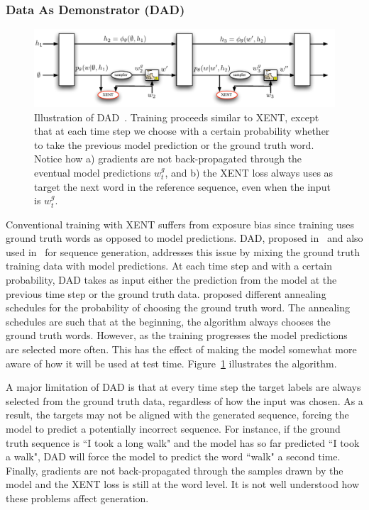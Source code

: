\subsubsection{Data As Demonstrator (DAD)} \label{model-dad}
\begin{figure}[!t]
\begin{center}
 \includegraphics[width=0.7\linewidth]{dad.pdf}
\end{center}
\caption{Illustration of DAD~\citep{sbengio-nips2015,
    dad}. Training
  proceeds similar to XENT, except that at each time step we choose with
  a certain probability whether to take the previous model prediction or
  the ground truth word. Notice how a) gradients are not
  back-propagated through the eventual model predictions $w^g_t$, and
  b) the XENT loss always uses as target the next word in the reference
  sequence, even when the input is $w^g_t$.}
\label{fig:dad}
\end{figure}
Conventional training with XENT suffers from exposure bias since  
training uses ground truth words as opposed to model predictions.
DAD, proposed in~\citep{dad} and also used in~\citep{sbengio-nips2015} for sequence generation, addresses this issue by mixing the ground truth training data with model predictions.
At each time step and with a certain probability, DAD takes as input either the prediction from the model at the previous time step or the ground truth data. \citet{sbengio-nips2015} proposed  different 
annealing schedules for the probability of choosing the ground truth word. The annealing schedules are such that at the beginning, the algorithm always chooses the ground truth words. However, as the training progresses the model predictions are selected more often. 
This has the effect of making the model somewhat more aware of how it will be used at test time. Figure~\ref{fig:dad} illustrates the algorithm. 

A major limitation of DAD is that at every time step the target labels are always selected from the ground truth data,  regardless of how the input was chosen. As a result, the targets may not be aligned with the generated sequence, forcing the model to predict a potentially incorrect sequence. 
For instance, if the ground truth sequence is ``I took a long
walk" and the model has so far predicted ``I took a walk", DAD will force the model to predict the word ``walk" a second time. 
Finally, gradients are not back-propagated through the samples drawn by the model and the XENT loss is still at the word level. 
It is not well understood how these problems affect generation.


